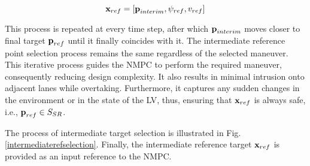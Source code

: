 \documentclass[letterpaper, 10 pt, conference]{ieeeconf}
\begin{document}
\begin{equation}
    \textbf{\text{x}}_{ref} = [\textbf{\text{p}}_{interim}, \psi_{ref}, v_{ref}]    
\end{equation}

This process is repeated at every time step, after which $\textbf{\text{p}}_{interim}$ moves closer to final target $\textbf{\text{p}}_{ref}$ until it finally coincides with it. The intermediate reference point selection process remains the same regardless of the selected maneuver. This iterative process guides the NMPC to perform the required maneuver, consequently reducing design complexity. It also results in minimal intrusion onto adjacent lanes while overtaking. Furthermore, it captures any sudden changes in the environment or in the state of the LV, thus, ensuring that $\textbf{\text{x}}_{ref}$ is always safe, i.e., $\textbf{\text{p}}_{ref} \in S_{SR}$.

The process of intermediate target selection is illustrated in Fig. \ref{intermediaterefselection}.
Finally, the intermediate reference target $\textbf{\text{x}}_{ref}$ is provided as an input reference to the NMPC.
\end{document}
